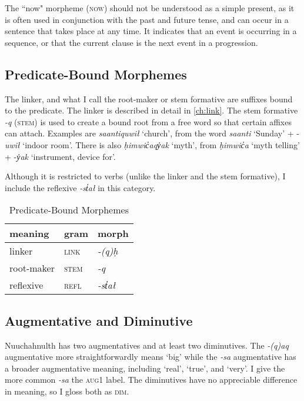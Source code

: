 The ``now" morpheme (\textsc{now}) should not be understood as a simple present, as it is often used in conjunction with the past and future tense, and can occur in a sentence that takes place at any time. It indicates that an event is occurring in a sequence, or that the current clause is the next event in a progression.

\subsection{Predicate-Bound Morphemes}

The linker, and what I call the root-maker or stem formative are suffixes bound to the predicate. The linker is described in detail in \cref{ch:link}. The stem formative \textit{-q} (\textsc{stem}) is used to create a bound root from a free word so that certain affixes can attach. Examples are \textit{saantiquwił} `church', from the word \textit{saanti} `Sunday' + -\textit{uwił} `indoor room'. There is also \textit{ḥimwic̓aqy̓ak} `myth', from \textit{ḥimwic̓a} `myth telling' + -\textit{y̓ak} `instrument, device for'.

Although it is restricted to verbs (unlike the linker and the stem formative), I include the reflexive \textit{-st̓ał} in this category.

\begin{table}[ht]
\centering
\caption{Predicate-Bound Morphemes}
\label{table:predicate}
\begin{tabular}{lll}
meaning                         & gram              & morph                       \\ \hline
\multicolumn{1}{|l|}{linker}    & \multicolumn{1}{l|}{\textsc{link}} & \multicolumn{1}{l|}{\textit{-(q)ḥ}} \\ \hline
\multicolumn{1}{|l|}{root-maker}    & \multicolumn{1}{l|}{\textsc{stem}} & \multicolumn{1}{l|}{\textit{-q}} \\ \hline
\multicolumn{1}{|l|}{reflexive} & \multicolumn{1}{l|}{\textsc{refl}} & \multicolumn{1}{l|}{\textit{-st̓ał}} \\ \hline
\end{tabular}
\end{table}

\subsection{Augmentative and Diminutive}

Nuuchahnulth has two augmentatives and at least two diminutives. The \textit{-(q)aq} augmentative more straightforwardly means `big' while the \textit{-sa} augmentative has a broader augmentative meaning, including `real', `true', and `very'. I give the more common \textit{-sa} the \textsc{aug1} label. The diminutives have no appreciable difference in meaning, so I gloss both as \textsc{dim}.

